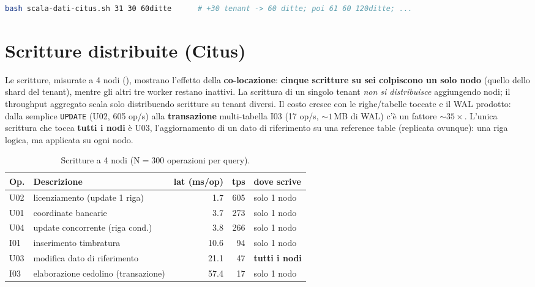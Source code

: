 \begin{lstlisting}[style=sobrio, language=bash, caption={Esecuzione: a 4 nodi fissi, un lotto per volta genera nuovi tenant, carica e misura a caldo (ripetuto fino a 480 ditte).}]
bash scala-dati-citus.sh 31 30 60ditte      # +30 tenant -> 60 ditte; poi 61 60 120ditte; ...
\end{lstlisting}

\section{Scritture distribuite (Citus)}
\label{sec:scritture-citus}

Le scritture, misurate a 4 nodi (), mostrano l'effetto della \textbf{co-locazione}:
\textbf{cinque scritture su sei colpiscono un solo nodo} (quello dello shard del tenant), mentre gli altri tre
worker restano inattivi. La scrittura di un singolo tenant \emph{non si distribuisce} aggiungendo nodi; il
throughput aggregato scala solo distribuendo scritture su tenant diversi. Il costo cresce con le righe/tabelle
toccate e il WAL prodotto: dalla semplice \texttt{UPDATE} (U02, 605 op/s) alla \textbf{transazione}
multi-tabella I03 (17 op/s, ${\sim}1$\,MB di WAL) c'è un fattore ${\sim}35\times$. L'unica scrittura che tocca
\textbf{tutti i nodi} è U03, l'aggiornamento di un dato di riferimento su una reference table (replicata
ovunque): una riga logica, ma applicata su ogni nodo.

\begin{table}[htbp]
  \centering
  \caption{Scritture a 4 nodi (N${=}300$ operazioni per query).}
  \label{tab:scritture-citus}
  \begin{tabular}{llrrl}
    \toprule
    \textbf{Op.} & \textbf{Descrizione} & \textbf{lat (ms/op)} & \textbf{tps} & \textbf{dove scrive} \\
    \midrule
    U02 & licenziamento (update 1 riga)     & 1.7  & 605 & solo 1 nodo \\
    U01 & coordinate bancarie               & 3.7  & 273 & solo 1 nodo \\
    U04 & update concorrente (riga cond.)   & 3.8  & 266 & solo 1 nodo \\
    I01 & inserimento timbratura            & 10.6 & 94  & solo 1 nodo \\
    U03 & modifica dato di riferimento      & 21.1 & 47  & \textbf{tutti i nodi} \\
    I03 & elaborazione cedolino (transazione)& 57.4 & 17  & solo 1 nodo \\
    \bottomrule
  \end{tabular}
\end{table}

